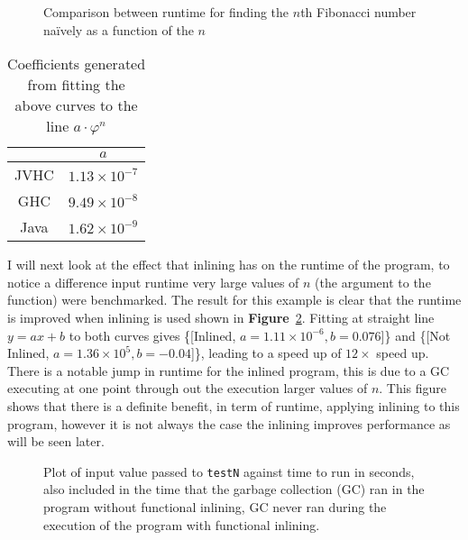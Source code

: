 \documentclass[float=false, crop=false]{standalone}
\newlength\gwidth
\newlength\gheight
\newcommand{\namefig}{\textbf{Figure}~}
\newcommand{\importMGraph}[3]{\setlength{\gwidth}{#2}\setlength{\gheight}{#3}{#1}}
\begin{document}
\begin{figure}
  \centering
  \importMGraph{plotFibRuntime.tex}{0.93\textwidth}{0.4\textwidth}
  \caption{Comparison between runtime for finding the $n$th Fibonacci number na\"ively as a 
  function of the $n$}
  \label{plot:fibTiming}
\end{figure}

\begin{table}
  \centering
\begin{tabular}{c | c}
  & $a$\\
  \hline 
  JVHC & $1.13\times 10^{-7}$\\
  GHC & $9.49\times 10^{-8}$\\
  Java & $1.62 \times 10^{-9}$
\end{tabular}
  \caption{Coefficients generated from fitting the above curves
    to the line $a\cdot \varphi^n$}
  \label{table:fibCoef}
\end{table}


I will next look at the effect that inlining has on the runtime of the 
program, to notice a difference input runtime very large values of $n$ (the 
argument to the function) were benchmarked. The result for this
example is clear that the runtime is improved when inlining is used shown in \namefig\ref{plot:inlinePlot}.
Fitting at straight line $y=ax+b$ to both curves gives 
  \{[Inlined, $a=1.11\times 10^{-6}, b = 0.076$]\} and 
  \{[Not Inlined, $a = 1.36\times 10^{5}, b= -0.04$]\}, leading to a speed up of $12 \times$ speed up.
  There is a notable jump in runtime for the inlined program, this is due to a GC 
  executing at one point through out the execution larger values of $n$. 
  This figure shows that there is a definite benefit, 
  in term of runtime, applying inlining to this program, however
  it is not always the case the inlining improves performance as will 
  be seen later. 

\begin{figure}
\begin{samepage}
  \centering
  \importMGraph{inlinePlot}{0.96\textwidth}{0.4\textwidth}
  \caption[Runtime of \texttt{testN} as a function on input size $n$]
  {Plot of input value passed to \texttt{testN} against time to run in seconds,
    also included in the time that the garbage collection (GC) ran in the program 
    without functional inlining, GC never ran during the execution of the 
    program with functional inlining. }
  \label{plot:inlinePlot}
\end{samepage}
\end{figure}
\end{document}
